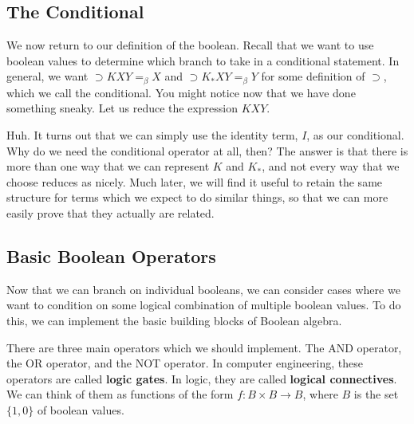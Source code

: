 \subsection{The Conditional}
We now return to our definition of the boolean. Recall that we want to use boolean values to determine which branch to take in a conditional statement. In general, we want $\supset KXY =_\beta X$ and $\supset K_*XY =_\beta Y$ for some definition of $\supset$, which we call the conditional. You might notice now that we have done something sneaky. Let us reduce the expression $KXY$.\\


Huh. It turns out that we can simply use the identity term, $I$, as our conditional. Why do we need the conditional operator at all, then? The answer is that there is more than one way that we can represent $K$ and $K_*$, and not every way that we choose reduces as nicely. Much later, we will find it useful to retain the same structure for terms which we expect to do similar things, so that we can more easily prove that they actually are related.

\subsection{Basic Boolean Operators}
Now that we can branch on individual booleans, we can consider cases where we want to condition on some logical combination of multiple boolean values. To do this, we can implement the basic building blocks of Boolean algebra.\\

There are three main operators which we should implement. The AND operator, the OR operator, and the NOT operator. In computer engineering, these operators are called \textbf{logic gates}. In logic, they are called \textbf{logical connectives}. We can think of them as functions of the form $f: B \times B \rightarrow B$, where $B$ is the set $\{1,0\}$ of boolean values.\\

